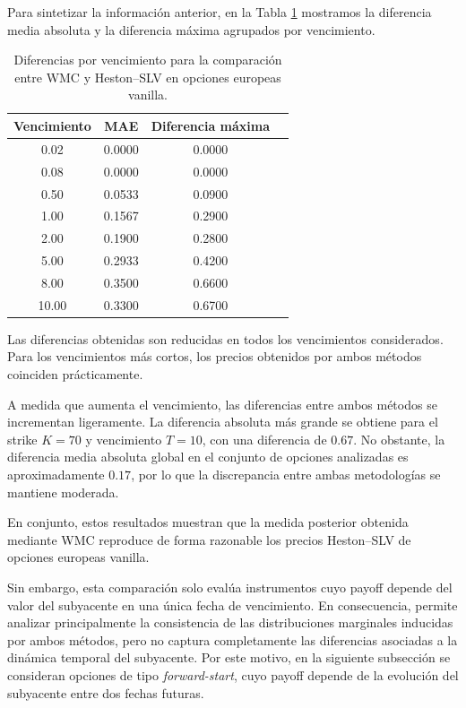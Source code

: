 Para sintetizar la información anterior, en la Tabla
\ref{tab:comparacion_vanilla_metricas} mostramos la diferencia media absoluta y la diferencia máxima agrupados por vencimiento.

\begin{table}[H]
\centering
\begin{tabular}{|c|c|c|c|}
\hline
 \textbf{Vencimiento} & \textbf{MAE} & \textbf{Diferencia máxima} \\
\hline
 0.02  & 0.0000 & 0.0000 \\
 0.08  & 0.0000 & 0.0000 \\
 0.50  & 0.0533 & 0.0900 \\
 1.00  & 0.1567 & 0.2900 \\
 2.00  & 0.1900 & 0.2800 \\
 5.00  & 0.2933 & 0.4200 \\
 8.00  & 0.3500 & 0.6600 \\
 10.00 & 0.3300 & 0.6700 \\
\hline
\end{tabular}
\caption{Diferencias por vencimiento para la comparación entre WMC y Heston--SLV en opciones europeas vanilla.}
\label{tab:comparacion_vanilla_metricas}
\end{table}

Las diferencias obtenidas son reducidas en todos los vencimientos considerados. Para
los vencimientos más cortos, los precios obtenidos por ambos métodos coinciden
prácticamente.\medskip

A medida que aumenta el vencimiento, las diferencias entre ambos métodos se
incrementan ligeramente. La diferencia absoluta más grande se obtiene para el strike \(K=70\)
y vencimiento \(T=10\), con una diferencia de \(0.67\). No
obstante, la diferencia media absoluta global en el conjunto de opciones analizadas es
aproximadamente \(0.17\), por lo que la discrepancia entre ambas metodologías se
mantiene moderada.

En conjunto, estos resultados muestran que la medida posterior obtenida mediante
WMC reproduce de forma razonable los precios Heston--SLV de opciones europeas
vanilla. \medskip

Sin embargo, esta comparación solo evalúa instrumentos cuyo payoff depende del
valor del subyacente en una única fecha de vencimiento. En consecuencia, permite
analizar principalmente la consistencia de las distribuciones marginales inducidas
por ambos métodos, pero no captura completamente las diferencias asociadas a la
dinámica temporal del subyacente. Por este motivo, en la siguiente subsección se
consideran opciones de tipo \textit{forward-start}, cuyo payoff depende de la evolución
del subyacente entre dos fechas futuras.



